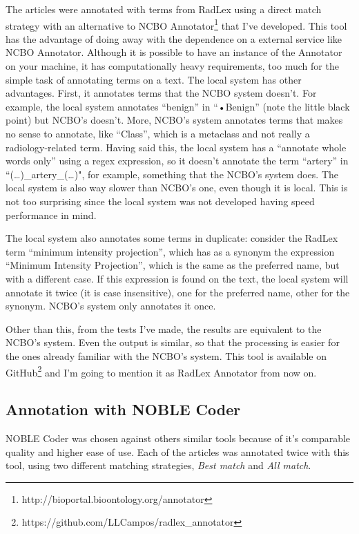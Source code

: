 The articles were annotated with terms from RadLex using a direct match strategy with an alternative to NCBO Annotator\footnote{http://bioportal.bioontology.org/annotator} that I've developed. This tool has the advantage of doing away with the dependence on a external service like NCBO Annotator. Although it is possible to have an instance of the Annotator on your machine, it has computationally heavy requirements, too much for the simple task of annotating terms on a text. The local system has other advantages. First, it annotates terms that the NCBO system doesn’t. For example, the local system annotates “benign” in “•Benign” (note the little black point) but NCBO's doesn’t. More, NCBO’s system annotates terms that makes no sense to annotate, like “Class”, which is a metaclass and not really a radiology-related term. Having said this, the local system has a “annotate whole words only” using a regex expression, so it doesn’t annotate the term “artery” in “(…)\_artery\_(…)", for example,  something that the NCBO’s system does. The local system is also way slower than NCBO's one, even though it is local. This is not too surprising since the local system was not developed having speed performance in mind. 

The local system also annotates some terms in duplicate: consider the RadLex term “minimum intensity projection”, which has as a synonym the expression “Minimum Intensity Projection”, which is the same as the preferred name, but with a different case. If this expression is found on the text, the local system will annotate it twice (it is case insensitive), one for the preferred name, other for the synonym. NCBO’s system only annotates it once. 

Other than this, from the tests I’ve made, the results are equivalent to the NCBO’s system. Even the output is similar, so that the processing is easier for the ones already familiar with the NCBO’s system. This tool is available on GitHub\footnote{https://github.com/LLCampos/radlex\_annotator} and I'm going to mention it as RadLex Annotator from now on.

\subsection{Annotation with NOBLE Coder}

NOBLE Coder was chosen against others similar tools because of it's comparable quality and higher ease of use. Each of the articles was annotated twice with this tool, using two different matching strategies, \textit{Best match} and \textit{All match}.


